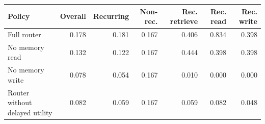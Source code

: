 \begin{tabular}{lrrrrrr}
\toprule
Policy & Overall & Recurring & Non-rec. & Rec. retrieve & Rec. read & Rec. write \\
\midrule
Full router & 0.178 & 0.181 & 0.167 & 0.406 & 0.834 & 0.398 \\
No memory read & 0.132 & 0.122 & 0.167 & 0.444 & 0.398 & 0.398 \\
No memory write & 0.078 & 0.054 & 0.167 & 0.010 & 0.000 & 0.000 \\
Router without delayed utility & 0.082 & 0.059 & 0.167 & 0.059 & 0.082 & 0.048 \\
\bottomrule
\end{tabular}
